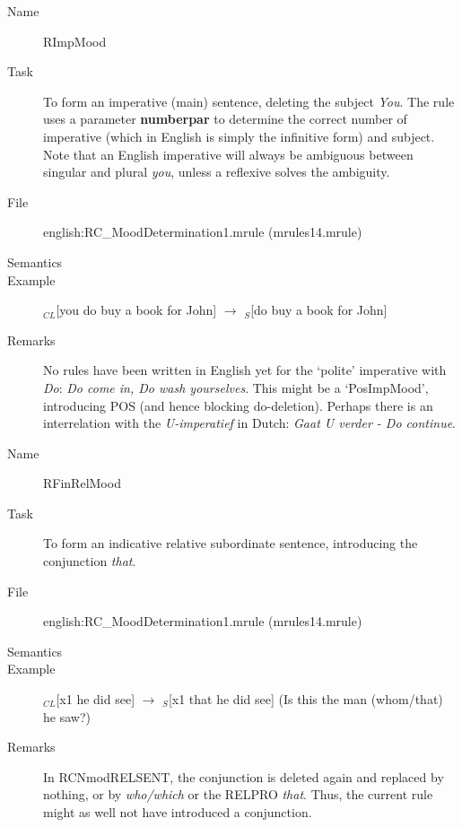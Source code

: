\begin{description}
\vspace{1 cm}
\begin{description}
\item[Name] RImpMood
\item[Task] To form an imperative (main) sentence, deleting the subject {\em 
You\/}. The rule uses a parameter {\bf numberpar} to determine the correct 
number of imperative (which in English is simply the infinitive form) and 
subject. Note that an English imperative will always be ambiguous between 
singular and plural {\em you\/}, unless a reflexive solves the ambiguity.
\item[File] english:RC\_MoodDetermination1.mrule (mrules14.mrule)
\item[Semantics]
\item[Example] $_{CL}$[you do buy a book for John] $\rightarrow$ $_S$[do buy a 
book for John]
\item[Remarks] No rules have been written in English yet for the `polite' 
imperative with {\em Do\/}: {\em Do come in, Do wash yourselves\/}. This might 
be a `PosImpMood', introducing POS (and hence blocking do-deletion). Perhaps 
there is an interrelation with the {\em U-imperatief\/} in Dutch: {\em Gaat 
U verder - Do continue\/}.
\end{description}

\vspace{1 cm}
\begin{description}
\item[Name] RFinRelMood
\item[Task] To form an indicative relative subordinate sentence, introducing 
the conjunction {\em that\/}.
\item[File] english:RC\_MoodDetermination1.mrule (mrules14.mrule)
\item[Semantics]
\item[Example] $_{CL}$[x1 he did see] $\rightarrow$ $_S$[x1 that he did see] 
(Is this the man (whom/that) he saw?)
\item[Remarks] In RCNmodRELSENT, the conjunction is deleted again and replaced 
by nothing, or by {\em who/which\/} or the RELPRO {\em that\/}. Thus, the 
current rule might as well not have introduced a conjunction.
\end{description}


\end{description}
